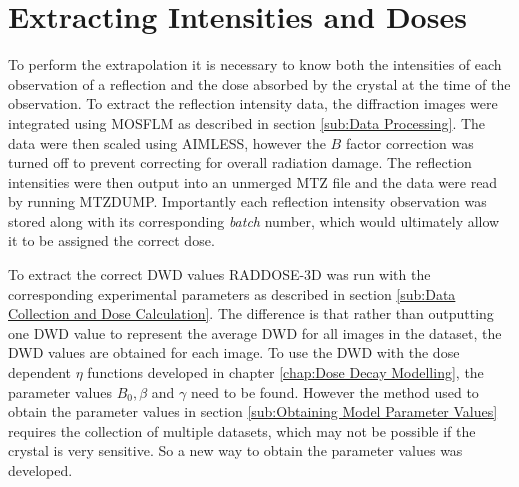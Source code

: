 \section{Extracting Intensities and Doses}
\label{sec:Extracting Intensities and Doses}
To perform the extrapolation it is necessary to know both the intensities of each observation of a reflection and the dose absorbed by the crystal at the time of the observation.
To extract the reflection intensity data, the diffraction images were integrated using MOSFLM as described in section \ref{sub:Data Processing}.
The data were then scaled using AIMLESS, however the $B$ factor correction was turned off to prevent correcting for overall radiation damage.
The reflection intensities were then output into an unmerged MTZ file and the data were read by running MTZDUMP.
Importantly each reflection intensity observation was stored along with its corresponding \textit{batch} number, which would ultimately allow it to be assigned the correct dose.

To extract the correct DWD values RADDOSE-3D was run with the corresponding experimental parameters as described in section \ref{sub:Data Collection and Dose Calculation}.
The difference is that rather than outputting one DWD value to represent the average DWD for all images in the dataset, the DWD values are obtained for each image.
To use the DWD with the dose dependent $\eta$ functions developed in chapter \ref{chap:Dose Decay Modelling}, the parameter values $B_0, \beta$ and $\gamma$ need to be found.
However the method used to obtain the parameter values in section \ref{sub:Obtaining Model Parameter Values} requires the collection of multiple datasets, which may not be possible if the crystal is very sensitive.
So a new way to obtain the parameter values was developed.

